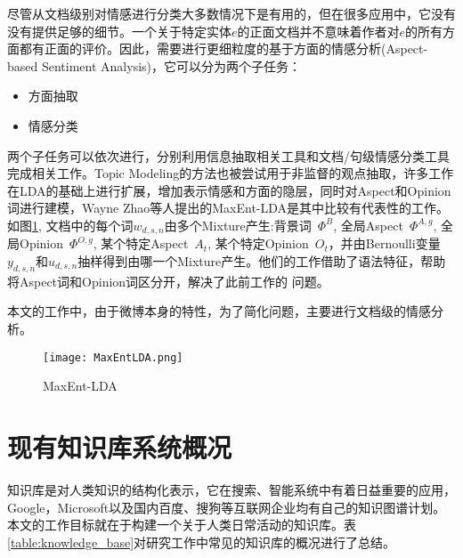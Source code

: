 尽管从文档级别对情感进行分类大多数情况下是有用的，但在很多应用中，它没有没有提供足够的细节。一个关于特定实体$e$的正面文档并不意味着作者对$e$的所有方面都有正面的评价。因此，需要进行更细粒度的基于方面的情感分析(Aspect-based Sentiment Analysis)，它可以分为两个子任务：
\begin{itemize}
\item 方面抽取
\item 情感分类
\end{itemize}
两个子任务可以依次进行，分别利用信息抽取相关工具和文档/句级情感分类工具完成相关工作。Topic Modeling的方法也被尝试用于非监督的观点抽取，许多工作在LDA的基础上进行扩展，增加表示情感和方面的隐层，同时对Aspect和Opinion词进行建模，Wayne Zhao等人提出的MaxEnt-LDA是其中比较有代表性的工作\cite{zhao2010jointly}。如图\ref{fig:maxent_lda}, 文档中的每个词$w_{d,s,n}$由多个Mixture产生:背景词\ $\Phi^B$, 全局Aspect\ $\Phi^{A,g}$, 全局Opinion\ $\Phi^{O,g}$, 某个特定Aspect\ $A_t$, 某个特定Opinion\ $O_t$，并由Bernoulli变量$y_{d,s,n}$和$u_{d,s,n}$抽样得到由哪一个Mixture产生。他们的工作借助了语法特征，帮助将Aspect词和Opinion词区分开，解决了此前工作的	问题\cite{titov2008modeling}。

本文的工作中，由于微博本身的特性，为了简化问题，主要进行文档级的情感分析。

\begin{figure}[!h]
\centering
\texttt{[image: MaxEntLDA.png]}
\caption{MaxEnt-LDA}
\label{fig:maxent_lda}
\end{figure}

\section{现有知识库系统概况}
知识库是对人类知识的结构化表示，它在搜索、智能系统中有着日益重要的应用，Google，Microsoft以及国内百度、搜狗等互联网企业均有自己的知识图谱计划。本文的工作目标就在于构建一个关于人类日常活动的知识库。表\ref{table:knowledge_base}对研究工作中常见的知识库的概况进行了总结。

